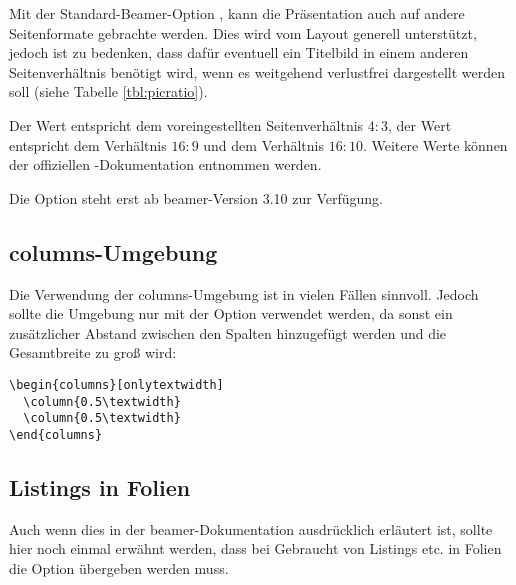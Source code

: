 \begin{Declaration}
\end{Declaration}

Mit der Standard-Beamer-Option , kann die Präsentation auch auf
andere Seitenformate gebrachte werden.
Dies wird vom Layout generell unterstützt, jedoch ist zu bedenken,
dass dafür eventuell ein Titelbild in einem anderen
Seitenverhältnis benötigt wird, wenn es weitgehend verlustfrei dargestellt werden soll
(siehe Tabelle \ref{tbl:picratio}).

Der Wert  entspricht dem voreingestellten Seitenverhältnis $4:3$,
der Wert  entspricht dem Verhältnis $16:9$ und 
dem Verhältnis $16:10$. Weitere Werte können der offiziellen
-Dokumentation\cite{beamer} entnommen werden.

\begin{hint}
Die Option  steht erst ab beamer-Version 3.10
zur Verfügung.
\end{hint}


\subsection{columns-Umgebung}

Die Verwendung der columns-Umgebung ist in vielen Fällen sinnvoll.
Jedoch sollte die Umgebung nur mit der Option 
verwendet werden, da sonst ein zusätzlicher Abstand zwischen den
Spalten hinzugefügt werden und die Gesamtbreite zu groß wird:

\begin{lstlisting}[morekeywords={onlytextwidth},keywordstyle=\color{tuOrange}]
\begin{columns}[onlytextwidth]
  \column{0.5\textwidth}
  \column{0.5\textwidth}
\end{columns}
\end{lstlisting}


\subsection{Listings in Folien}

Auch wenn dies in der beamer-Dokumentation ausdrücklich erläutert ist,
sollte hier noch einmal erwähnt werden, dass bei Gebraucht von Listings etc.
in Folien die Option  übergeben werden muss.

